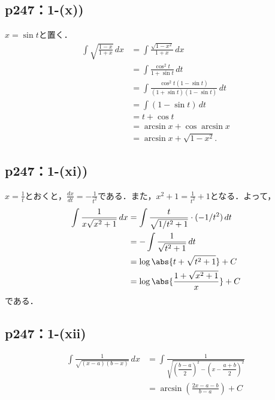 \documentclass[a4paper,10pt,fleqn]{ltjsarticle}
\begin{document}
\subsection*{p247：1-(x))}

  \begin{leftbar}
    $x = \sin t$と置く．
    \begin{align*}
      \int \sqrt {\frac{1-x}{1+x}} \,dx
      &= \int \frac{\sqrt{1-x^2}}{1+x} \,dx \\
      &= \int \frac{\cos^2 t}{1 + \sin t} \,dt \\
      &= \int \frac{\cos^2 t(1 - \sin t)}{(1 + \sin t)(1 - \sin t)} \,dt \\
      &= \int (1 - \sin t) \,dt \\
      &= t + \cos t \\
      &= \arcsin x  + \cos \arcsin x \\
      &= \arcsin x + \sqrt{1-x^2}.
    \end{align*}
  \end{leftbar}

\subsection*{p247：1-(xi))}


\begin{tleftbar}
    $x=\frac{1}{t}$とおくと，$\frac{dx}{dt}=-\frac{1}{t^2}$である．また，$x^2+1 = \frac{1}{t^2} +1$となる．よって，
    \begin{align*} 
        \int \frac{1}{x\sqrt{x^2+1}} \, dx & = \int \frac{t}{\sqrt{1/t^2+1}} \cdot (-1/t^2) \, dt \\
        & = -\int \frac{1}{\sqrt{t^2+1}} \, dt \\
        & = \log \abs{t+\sqrt{t^2+1}}+ C \\
        & = \log \abs{\frac{1+\sqrt{x^2+1}}{x}}+C
    \end{align*}
    である．
\end{tleftbar}


\subsection*{p247：1-(xii)}


\begin{tleftbar}
    \begin{align*} 
        \int \frac{1}{\sqrt{(x-a)(b-x)}} \, dx & = \int \frac{1}{\sqrt{\left (\dfrac{b-a}{2} \right )^2 - \left (x-\dfrac{a+b}{2} \right )^2 }} \\
        & = \arcsin \left (\frac{2x-a-b}{b-a} \right)+C
    \end{align*}
\end{tleftbar}
\end{document}
